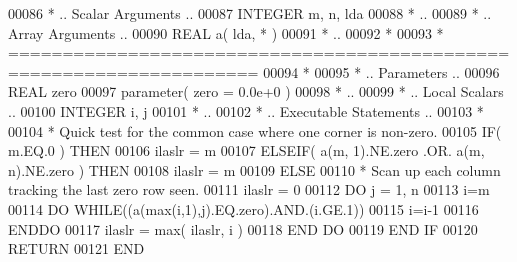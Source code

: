 \begin{DoxyCode}
00086 \textcolor{comment}{*     .. Scalar Arguments ..}
00087       \textcolor{keywordtype}{INTEGER}            m, n, lda
00088 \textcolor{comment}{*     ..}
00089 \textcolor{comment}{*     .. Array Arguments ..}
00090       \textcolor{keywordtype}{REAL}               a( lda, * )
00091 \textcolor{comment}{*     ..}
00092 \textcolor{comment}{*}
00093 \textcolor{comment}{*  =====================================================================}
00094 \textcolor{comment}{*}
00095 \textcolor{comment}{*     .. Parameters ..}
00096       \textcolor{keywordtype}{REAL}             zero
00097       parameter( zero = 0.0e+0 )
00098 \textcolor{comment}{*     ..}
00099 \textcolor{comment}{*     .. Local Scalars ..}
00100       \textcolor{keywordtype}{INTEGER} i, j
00101 \textcolor{comment}{*     ..}
00102 \textcolor{comment}{*     .. Executable Statements ..}
00103 \textcolor{comment}{*}
00104 \textcolor{comment}{*     Quick test for the common case where one corner is non-zero.}
00105       \textcolor{keywordflow}{IF}( m.EQ.0 ) \textcolor{keywordflow}{THEN}
00106          ilaslr = m
00107       \textcolor{keywordflow}{ELSEIF}( a(m, 1).NE.zero .OR. a(m, n).NE.zero ) \textcolor{keywordflow}{THEN}
00108          ilaslr = m
00109       \textcolor{keywordflow}{ELSE}
00110 \textcolor{comment}{*     Scan up each column tracking the last zero row seen.}
00111          ilaslr = 0
00112          \textcolor{keywordflow}{DO} j = 1, n
00113             i=m
00114             \textcolor{keywordflow}{DO} \textcolor{keywordflow}{WHILE}((a(max(i,1),j).EQ.zero).AND.(i.GE.1))
00115                i=i-1
00116 \textcolor{keywordflow}{            ENDDO}
00117             ilaslr = max( ilaslr, i )
00118 \textcolor{keywordflow}{         END DO}
00119 \textcolor{keywordflow}{      END IF}
00120       \textcolor{keywordflow}{RETURN}
00121 \textcolor{keyword}{      END}
\end{DoxyCode}
